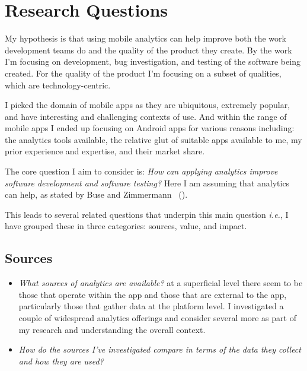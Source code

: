\chapter{Research Questions}
My hypothesis is that using mobile analytics can help improve both the work development teams do and the quality of the product they create. By the work I'm focusing on development, bug investigation, and testing of the software being created. For the quality of the product I'm focusing on a subset of qualities, which are technology-centric.

I picked the domain of mobile apps as they are ubiquitous, extremely popular, and have interesting and challenging contexts of use. And within the range of mobile apps I ended up focusing on Android apps for various reasons including: the analytics tools available, the relative glut of suitable apps available to me, my prior experience and expertise, and their market share.

The core question I aim to consider is: 
\emph{How can applying analytics improve software development and software testing?} Here I am assuming that analytics can help, as stated by Buse and Zimmermann ~(\citeyear{buse_analytics_2010}).

This leads to several related questions that underpin this main question \emph{i.e.}, I have grouped these in three categories: sources, value, and impact.


\section{Sources}
\begin{itemize}
    \item \emph{What sources of analytics are available?} at a superficial level there seem to be those that operate within the app and those that are external to the app, particularly those that gather data at the platform level. I investigated a couple of widespread analytics offerings and consider several more as part of my research and understanding the overall context.
    \item \emph{How do the sources I've investigated compare in terms of the data they collect and how they are used?}
\end{itemize}

